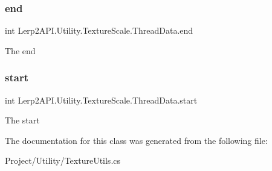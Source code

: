 \subsubsection{\texorpdfstring{end}{end}}
{\footnotesize\ttfamily int Lerp2\+A\+P\+I.\+Utility.\+Texture\+Scale.\+Thread\+Data.\+end}



The end 

\mbox{\label{class_lerp2_a_p_i_1_1_utility_1_1_texture_scale_1_1_thread_data_ad328b15a0f0466dbcb2d292159a1cb26}} 
\subsubsection{\texorpdfstring{start}{start}}
{\footnotesize\ttfamily int Lerp2\+A\+P\+I.\+Utility.\+Texture\+Scale.\+Thread\+Data.\+start}



The start 



The documentation for this class was generated from the following file\+:\begin{DoxyCompactItemize}
\item 
Project/\+Utility/Texture\+Utils.\+cs\end{DoxyCompactItemize}
